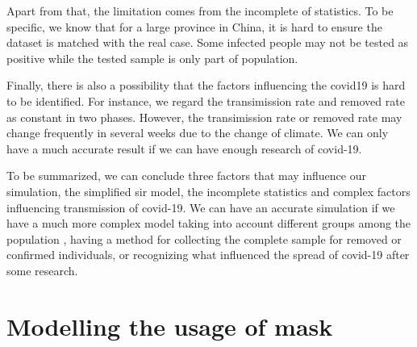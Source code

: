 \documentclass{article}
\begin{document}
Apart from that, the limitation comes from the incomplete of statistics. To be specific, we know that for a large province in China, it is hard to ensure the dataset is matched with the real case. Some infected people may not be tested as positive while the tested sample is only part of population.

Finally, there is also a possibility that the factors influencing the covid19 is hard to be identified. For instance, we regard the transimission rate and removed rate as constant in two phases. However, the transimission rate or removed rate may change frequently in several weeks due to the change of climate. We can only have a much accurate result if we can have enough research of covid-19.

To be summarized, we can conclude three factors that may influence our simulation, the simplified sir model, the incomplete statistics and complex factors influencing transmission of covid-19. We can have an accurate simulation if we have a much more complex model taking into account different groups among the population , having a method for collecting the complete sample for removed or confirmed individuals, or recognizing what influenced the spread of covid-19 after some research.


\section{Modelling the usage of mask}
\end{document}

